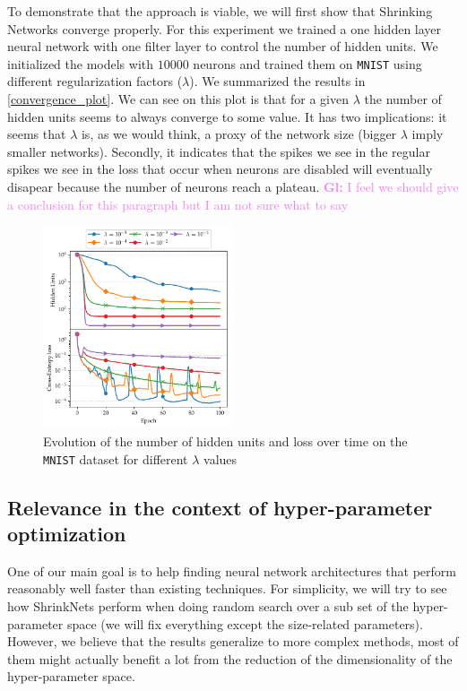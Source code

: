 \documentclass[sigconf]{acmart}
\newcommand{\gl}[1]{\textcolor{violet}{{\bf Gl:} #1}}
\begin{document}
To demonstrate that the approach is viable, we will first show that Shrinking
Networks converge properly. For this experiment we trained a one hidden layer
neural network with one filter layer to control the number of hidden units. We
initialized the models with $10000$ neurons and trained them on \texttt{MNIST}
using different regularization factors ($\lambda$). We summarized the results
in \autoref{convergence_plot}. We can see on this plot is that
for a given $\lambda$ the number of hidden units seems to always converge to
some value. It has two implications: it seems that $\lambda$ is, as we would think,
a proxy of the network size (bigger $\lambda$ imply smaller networks). Secondly,
it indicates that the spikes we see in the regular spikes we see in the loss that occur when neurons are disabled will eventually disapear because the number of neurons reach a plateau. \gl{I feel we should give a conclusion for this paragraph but
I am not sure what to say}
\begin{figure}
\begin{center}
\includegraphics[width=0.5\textwidth]{convergence}
\caption{Evolution of the number of hidden units and loss over time on the \texttt{MNIST} dataset for different $\lambda$ values \label{convergence_plot}}
\end{center}
\end{figure}


\subsection{Relevance in the context of hyper-parameter optimization}

One of our main goal is to help finding neural network architectures that
perform reasonably well faster than existing techniques. For simplicity, we
will try to see how ShrinkNets perform when doing random search over a sub set
of the hyper-parameter space (we will fix everything except the size-related
parameters). However, we believe that the results generalize to more complex
methods, most of them might actually benefit a lot from the reduction of the
dimensionality of the hyper-parameter space.
\end{document}
